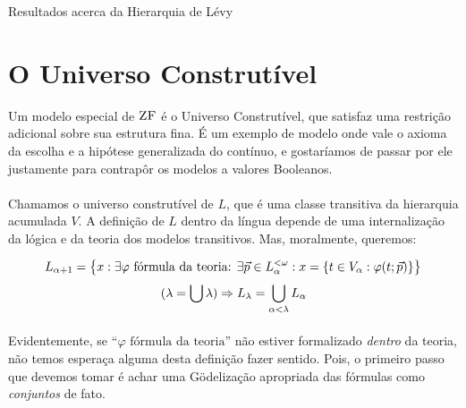 \begin{theorem}{Resultados acerca da Hierarquia de Lévy}
%                        
%                        
                \end{theorem}
    \section{O Universo Construtível}
            Um modelo especial de $\text{\sc ZF}$ é o Universo Construtível, que satisfaz uma restrição adicional sobre sua estrutura fina. É um exemplo 
            de modelo onde vale o axioma da escolha e a hipótese generalizada do contínuo, e gostaríamos de passar por ele justamente para 
            contrapôr os modelos a valores Booleanos.
        \paragraph{}
            Chamamos o universo construtível de $L$, que é uma classe transitiva da hierarquia acumulada $V$. A definição de $L$ dentro da 
            língua depende de uma internalização da lógica e da teoria dos modelos transitivos. Mas, moralmente, queremos:

        $$ L_{\alpha+1} = \SET{x : \exists \varphi \text { fórmula da teoria: }\exists \vec{p} \in L_\alpha^{<\omega}: x = \SET{t\in V_\alpha : \varphi(t; \vec{p})}} $$
        $$ (\lambda = \bigcup \lambda) \Rightarrow L_\lambda = \bigcup_{\alpha<\lambda}L_\alpha $$

        \paragraph{}
            Evidentemente, se ``$\varphi \text{ fórmula da teoria}$'' não estiver formalizado \textit{dentro} da teoria, não 
            temos esperaça alguma desta definição fazer sentido. Pois, o primeiro passo que devemos tomar é achar uma Gödelização
            apropriada das fórmulas como \textit{conjuntos} de fato. 
